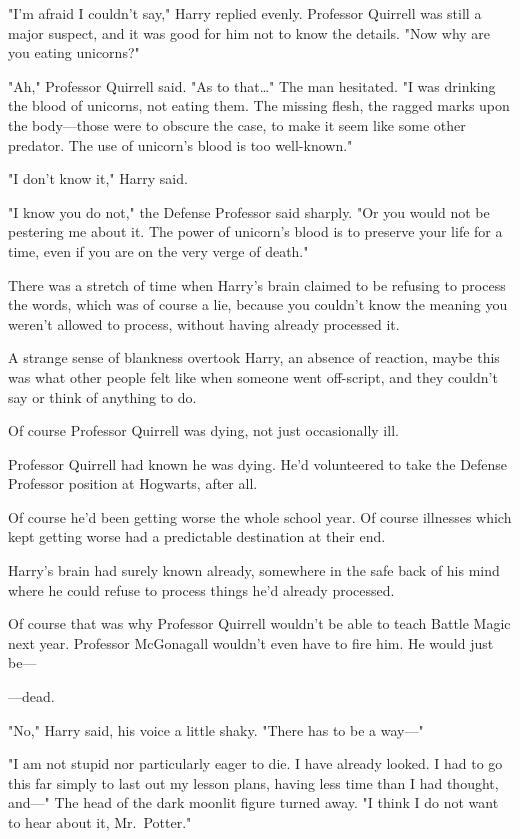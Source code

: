 "I'm afraid I couldn't say," Harry replied evenly. Professor Quirrell was still 
a major suspect, and it was good for him not to know the details. "Now why are 
you eating unicorns?"

"Ah," Professor Quirrell said. "As to that…" The man hesitated. "I was drinking 
the blood of unicorns, not eating them. The missing flesh, the ragged marks 
upon the body---those were to obscure the case, to make it seem like some other 
predator. The use of unicorn's blood is too well-known."

"I don't know it," Harry said.

"I know you do not," the Defense Professor said sharply. "Or you would not be 
pestering me about it. The power of unicorn's blood is to preserve your life 
for a time, even if you are on the very verge of death."

There was a stretch of time when Harry's brain claimed to be refusing to 
process the words, which was of course a lie, because you couldn't know the 
meaning you weren't allowed to process, without having already processed it.

A strange sense of blankness overtook Harry, an absence of reaction, maybe this 
was what other people felt like when someone went off-script, and they couldn't 
say or think of anything to do.

Of course Professor Quirrell was dying, not just occasionally ill.

Professor Quirrell had known he was dying. He'd volunteered to take the Defense 
Professor position at Hogwarts, after all.

Of course he'd been getting worse the whole school year. Of course illnesses 
which kept getting worse had a predictable destination at their end.

Harry's brain had surely known already, somewhere in the safe back of his mind 
where he could refuse to process things he'd already processed.

Of course that was why Professor Quirrell wouldn't be able to teach Battle 
Magic next year. Professor McGonagall wouldn't even have to fire him. He would 
just be---

---dead.

"No," Harry said, his voice a little shaky. "There has to be a way---"

"I am not stupid nor particularly eager to die. I have already looked. I had to 
go this far simply to last out my lesson plans, having less time than I had 
thought, and---" The head of the dark moonlit figure turned away. "I think I do 
not want to hear about it, Mr.~Potter."

